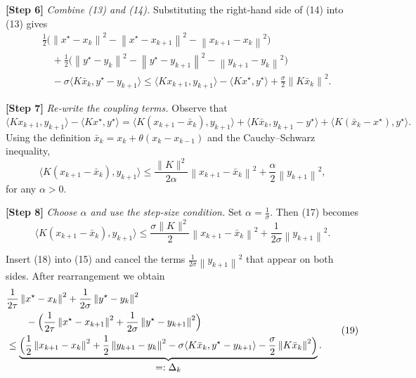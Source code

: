 \documentclass{article}
\newcommand{\inner}[2]{\langle #1,#2\rangle}
\newcommand{\norm}[1]{\left\|#1\right\|}
\begin{document}
\noindent\textbf{[Step 6]} \emph{Combine (13) and (14).}  
Substituting the right‑hand side of (14) into (13) gives
\[
\begin{aligned}
&\frac{1}{2}\bigl(\norm{x^{\star}-x_{k}}^{2}
-\norm{x^{\star}-x_{k+1}}^{2}
-\norm{x_{k+1}-x_{k}}^{2}\bigr)\\
&\quad+\frac{1}{2}\bigl(\norm{y^{\star}-y_{k}}^{2}
-\norm{y^{\star}-y_{k+1}}^{2}
-\norm{y_{k+1}-y_{k}}^{2}\bigr)\\
&\quad-\sigma\inner{K\bar x_{k}}{y^{\star}-y_{k+1}}
\le
\inner{Kx_{k+1}}{y_{k+1}}-\inner{Kx^{\star}}{y^{\star}}
+\frac{\sigma}{2}\norm{K\bar x_{k}}^{2}.
\end{aligned}
\tag{15}
\]

\noindent\textbf{[Step 7]} \emph{Re‑write the coupling terms.}  
Observe that
\[
\inner{Kx_{k+1}}{y_{k+1}}-\inner{Kx^{\star}}{y^{\star}}
=
\inner{K(x_{k+1}-\bar x_{k})}{y_{k+1}}
+\inner{K\bar x_{k}}{y_{k+1}-y^{\star}}
+\inner{K(\bar x_{k}-x^{\star})}{y^{\star}}.
\tag{16}
\]
Using the definition $\bar x_{k}=x_{k}+\theta(x_{k}-x_{k-1})$ and the Cauchy–Schwarz inequality,
\[
\inner{K(x_{k+1}-\bar x_{k})}{y_{k+1}}
\le
\frac{\|K\|^{2}}{2\alpha}\norm{x_{k+1}-\bar x_{k}}^{2}
+\frac{\alpha}{2}\norm{y_{k+1}}^{2},
\tag{17}
\]
for any $\alpha>0$.

\noindent\textbf{[Step 8]} \emph{Choose $\alpha$ and use the step‑size condition.}  
Set $\alpha=\frac{1}{\sigma}$. Then (17) becomes
\[
\inner{K(x_{k+1}-\bar x_{k})}{y_{k+1}}
\le
\frac{\sigma\|K\|^{2}}{2}\norm{x_{k+1}-\bar x_{k}}^{2}
+\frac{1}{2\sigma}\norm{y_{k+1}}^{2}.
\tag{18}
\]

Insert (18) into (15) and cancel the terms $\frac{1}{2\sigma}\norm{y_{k+1}}^{2}$ that appear on both sides.  After rearrangement we obtain
\[
\begin{aligned}
&\frac{1}{2\tau}\norm{x^{\star}-x_{k}}^{2}
+\frac{1}{2\sigma}\norm{y^{\star}-y_{k}}^{2}\\
&\qquad-
\Bigl(\frac{1}{2\tau}\norm{x^{\star}-x_{k+1}}^{2}
+\frac{1}{2\sigma}\norm{y^{\star}-y_{k+1}}^{2}\Bigr)\\
&\le
\underbrace{\Bigl(\frac{1}{2}\norm{x_{k+1}-x_{k}}^{2}
+\frac{1}{2}\norm{y_{k+1}-y_{k}}^{2}
-\sigma\inner{K\bar x_{k}}{y^{\star}-y_{k+1}}
-\frac{\sigma}{2}\norm{K\bar x_{k}}^{2}\Bigr)}_{\displaystyle=: \Delta_{k}}.
\end{aligned}
\tag{19}
\]
\end{document}
